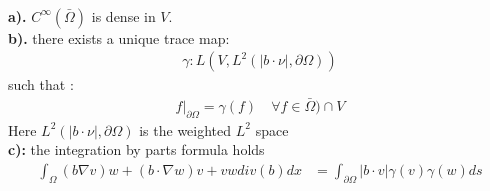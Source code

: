 \begin{theorem}\quad\\
	\textbf{a).} $C^\infty(\bar{\Omega})$ is dense in $V$. \\
	\textbf{b).} there exists a unique trace map:
	\begin{align*}
		\gamma: L(V, L^2(|b \cdot 
		\nu|, \partial \Omega))
	\end{align*}
	such that :
	\begin{align*}
		f|_{\partial\Omega} = \gamma(f) \quad \forall f \in \bar{\Omega}) \cap V
	\end{align*}
	Here $L^2(|b \cdot \nu|, \partial \Omega)$ is the weighted $L^2$ space \\
	\textbf{c):} the integration by parts formula holds
	\begin{align*}
		\int_\Omega (b \nabla v ) w + (b \cdot \nabla w) v + vw div( b) dx 
		&= \int_{\partial \Omega} | b \cdot v | \gamma (v) \gamma(w) ds
	\end{align*}	
\end{theorem}
